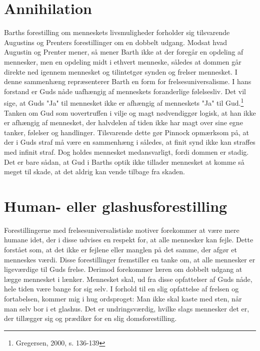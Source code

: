 \section{Annihilation}
Barths forestilling om menneskets livsmuligheder forholder sig tilsvarende Augustins og Prenters forestillinger om en dobbelt udgang. Modsat hvad Augustin og Prenter mener, så mener Barth ikke at der foregår en opdeling af mennesker, men en opdeling midt i ethvert menneske, således at dommen går direkte ned igennem mennesket og tilintetgør synden og frelser mennesket. I denne sammenhæng repræsenterer Barth en form for frelsesuniversalisme. I hans forstand er Guds nåde uafhængig af menneskets foranderlige følelsesliv. Det vil sige, at Guds "Ja" til mennesket ikke er afhængig af menneskets "Ja" til Gud.\footnote {Gregersen, 2000, s. 136-139} Tanken om Gud som uovertruffen i vilje og magt nødvendiggør logisk, at han ikke er afhængig af mennesket, der halvdelen af tiden ikke har magt over sine egne tanker, følelser og handlinger. Tilsvarende dette gør Pinnock opmærksom på, at der i Guds straf må være en sammenhæng i således, at finit synd ikke kan straffes med infinit straf. Dog holdes mennesket medansvarligt, fordi dommen er stadig. Det er bare sådan, at Gud i Barths optik ikke tillader mennesket at komme så meget til skade, at det aldrig kan vende tilbage fra skaden. 

\section{Human- eller glashusforestilling}
Forestillingerne med frelsesuniversalistiske motiver forekommer at være mere humane idet, der i disse udvises en respekt for, at alle mennesker kan fejle. Dette forstået som, at det ikke er fejlene eller manglen på det samme, der afgør et menneskes værdi. Disse forestillinger fremstiller en tanke om, at alle mennesker er ligeværdige til Guds frelse. Derimod forekommer læren om dobbelt udgang at lægge mennesket i lænker. Mennesket skal, ud fra disse opfattelser af Guds nåde, hele tiden være bange for sig selv. I forhold til en slig opfattelse af frelsen og fortabelsen, kommer mig i hug ordsproget: Man ikke skal kaste med sten, når man selv bor i et glashus. Det er undringsværdig, hvilke slags mennesker det er, der tillægger sig og prædiker for en slig domsforestilling.